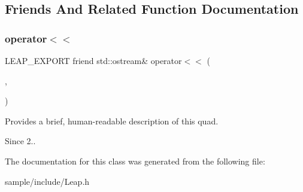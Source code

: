 \subsection{Friends And Related Function Documentation}
\mbox{\label{class_leap_1_1_tracked_quad_a954712e5d46bca5109e8508a9397538a}} 
\subsubsection{\texorpdfstring{operator$<$$<$}{operator<<}}
{\footnotesize\ttfamily L\+E\+A\+P\+\_\+\+E\+X\+P\+O\+RT friend std\+::ostream\& operator$<$$<$ (\begin{DoxyParamCaption}\item[{std\+::ostream \&}]{,  }\item[{const \hyperlink{class_leap_1_1_tracked_quad}{Tracked\+Quad} \&}]{ }\end{DoxyParamCaption})\hspace{0.3cm}{\ttfamily [friend]}}

Provides a brief, human-\/readable description of this quad. \begin{DoxySince}{Since}
2.. 
\end{DoxySince}


The documentation for this class was generated from the following file\+:\begin{DoxyCompactItemize}
\item 
sample/include/Leap.\+h\end{DoxyCompactItemize}
